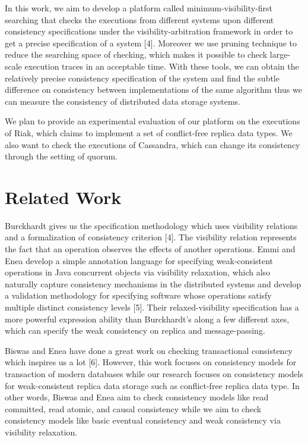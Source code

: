 \documentclass[sigconf,review,screen,anonymous]{acmart}
\begin{document}
In this work, we aim to develop a platform called minimum-visibility-first searching that checks the executions from different systems upon different consistency specifications under the visibility-arbitration framework in order to get a precise specification of a system [4]. 
Moreover we use pruning technique to reduce the searching space of checking, which makes it possible to check large-scale execution traces in an acceptable time. 
With these tools, we can obtain the relatively precise consistency specification of the system and find the subtle difference on consistency between implementations of the same algorithm thus we can measure the consistency of distributed data storage systems.

We plan to provide an experimental evaluation of our platform on the executions of Riak, which claims to implement a set of conflict-free replica data types. 
We also want to check the executions of Cassandra, which can change its consistency through the setting of quorum.

\section{Related Work}
Burckhardt gives us the specification methodology which uses visibility relations and a formalization of consistency criterion [4]. The visibility relation represents the fact that an operation observes the effects of another operations. Emmi and Enea develop a simple annotation language for specifying weak-consistent operations in Java concurrent objects via visibility relaxation, which also naturally capture consistency mechanisms in the distributed systems and develop a validation methodology for specifying software whose operations satisfy multiple distinct consistency levels [5]. Their relaxed-visibility specification has a more powerful expression ability than Burckhardt's along a few different axes, which can specify the weak consistency on replica and message-passing.

Biswas and Enea have done a great work on checking transactional consistency which inspires us a lot [6]. However, this work focuses on consistency models for transaction of modern databases while our research focuses on consistency models for weak-consistent replica data storage such as conflict-free replica data type. In other words,  Biswas and Enea aim to check consistency models like read committed, read atomic, and causal consistency while we aim to check consistency models like basic eventual consistency and weak consistency via visibility relaxation.
\end{document}
